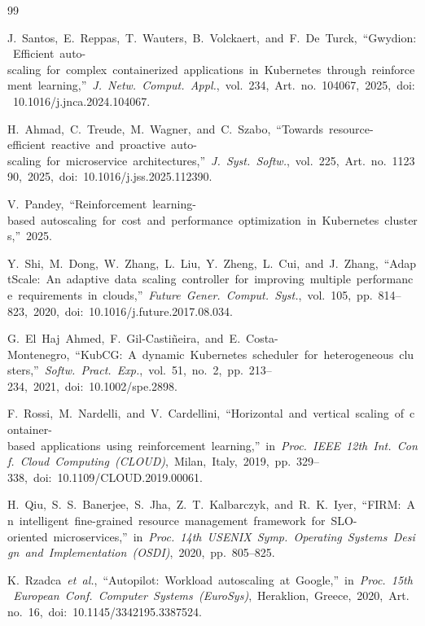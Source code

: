 \documentclass[12pt,a4paper,oneside]{report}
\begin{document}
\clearpage
\renewcommand{\bibname}{References}
\begin{thebibliography}{99}
{}
\setlength{\itemsep}{6pt}
\setlength{\parskip}{0pt}

J.~Santos,~E.~Reppas,~T.~Wauters,~B.~Volckaert,~and~F.~De~Turck,~``Gwydion:~Efficient~auto-scaling~for~complex~containerized~applications~in~Kubernetes~through~reinforcement~learning,''~\textit{J.~Netw.~Comput.~Appl.},~vol.~234,~Art.~no.~104067,~2025,~doi:~10.1016/j.jnca.2024.104067.

H.~Ahmad,~C.~Treude,~M.~Wagner,~and~C.~Szabo,~``Towards~resource-efficient~reactive~and~proactive~auto-scaling~for~microservice~architectures,''~\textit{J.~Syst.~Softw.},~vol.~225,~Art.~no.~112390,~2025,~doi:~10.1016/j.jss.2025.112390.

V.~Pandey,~``Reinforcement~learning-based~autoscaling~for~cost~and~performance~optimization~in~Kubernetes~clusters,''~2025.

Y.~Shi,~M.~Dong,~W.~Zhang,~L.~Liu,~Y.~Zheng,~L.~Cui,~and~J.~Zhang,~``AdaptScale:~An~adaptive~data~scaling~controller~for~improving~multiple~performance~requirements~in~clouds,''~\textit{Future~Gener.~Comput.~Syst.},~vol.~105,~pp.~814--823,~2020,~doi:~10.1016/j.future.2017.08.034.

G.~El~Haj~Ahmed,~F.~Gil-Castiñeira,~and~E.~Costa-Montenegro,~``KubCG:~A~dynamic~Kubernetes~scheduler~for~heterogeneous~clusters,''~\textit{Softw.~Pract.~Exp.},~vol.~51,~no.~2,~pp.~213--234,~2021,~doi:~10.1002/spe.2898.

F.~Rossi,~M.~Nardelli,~and~V.~Cardellini,~``Horizontal~and~vertical~scaling~of~container-based~applications~using~reinforcement~learning,''~in~\textit{Proc.~IEEE~12th~Int.~Conf.~Cloud~Computing~(CLOUD)},~Milan,~Italy,~2019,~pp.~329--338,~doi:~10.1109/CLOUD.2019.00061.

H.~Qiu,~S.~S.~Banerjee,~S.~Jha,~Z.~T.~Kalbarczyk,~and~R.~K.~Iyer,~``FIRM:~An~intelligent~fine-grained~resource~management~framework~for~SLO-oriented~microservices,''~in~\textit{Proc.~14th~USENIX~Symp.~Operating~Systems~Design~and~Implementation~(OSDI)},~2020,~pp.~805--825.

K.~Rzadca~\textit{et~al.},~``Autopilot:~Workload~autoscaling~at~Google,''~in~\textit{Proc.~15th~European~Conf.~Computer~Systems~(EuroSys)},~Heraklion,~Greece,~2020,~Art.~no.~16,~doi:~10.1145/3342195.3387524.


\end{thebibliography}
\end{document}
